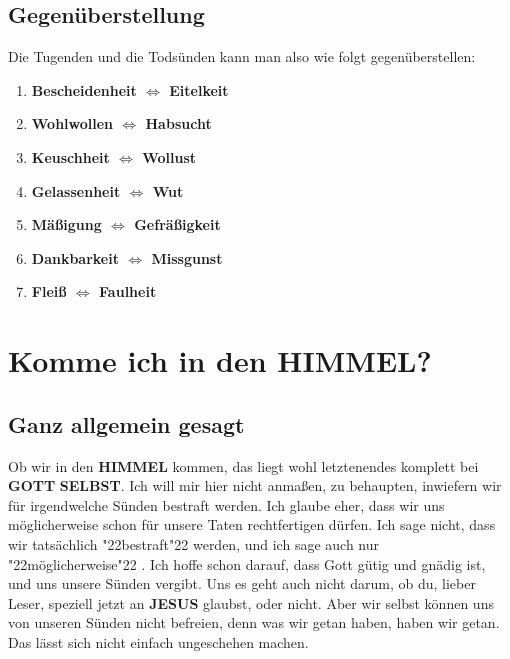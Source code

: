 \documentclass[10pt,a5paper]{article}
\newcommand{\Gott}[0]{\textbf{GOTT}}
\newcommand{\Himmel}[0]{\textbf{HIMMEL}}
\newcommand{\Jesus}[0]{\textbf{JESUS}}
\newcommand{\Selbst}[0]{\textbf{SELBST}}
\newcommand{\q}[1]{\char"22{#1}\char"22 }
\begin{document}
	\subsection{Gegen\"uberstellung}
		Die Tugenden und die Todsünden kann man also wie folgt gegen\"uberstellen:
		\begin{enumerate}
			\item \textbf{Bescheidenheit $\Longleftrightarrow$ Eitelkeit}
			\item \textbf{Wohlwollen $\Longleftrightarrow$ Habsucht}
			\item \textbf{Keuschheit $\Longleftrightarrow$ Wollust}
			\item \textbf{Gelassenheit $\Longleftrightarrow$ Wut}
			\item \textbf{M\"a{\ss}igung $\Longleftrightarrow$ Gefr\"a{\ss}igkeit}
			\item \textbf{Dankbarkeit $\Longleftrightarrow$ Missgunst}
			\item \textbf{Flei{\ss} $\Longleftrightarrow$ Faulheit}
		\end{enumerate}

	\newpage
	\section{Komme ich in den {\Himmel}?}
	
	\subsection{Ganz allgemein gesagt}
		Ob wir in den {\Himmel} kommen,
		das liegt wohl letztenendes komplett bei {\Gott} {\Selbst}.
		Ich will mir hier nicht anma{\ss}en,
		zu behaupten,
		inwiefern wir f\"ur irgendwelche S\"unden bestraft werden.
		Ich glaube eher,
		dass wir uns m\"oglicherweise schon f\"ur unsere Taten rechtfertigen d\"urfen.
		Ich sage nicht,
		dass wir tats\"achlich \q{bestraft} werden,
		und ich sage auch nur \q{m\"oglicherweise}.
		Ich hoffe schon darauf,
		dass Gott g\"utig und gn\"adig ist,
		und uns unsere S\"unden vergibt.
		Uns es geht auch nicht darum,
		ob du,
		lieber Leser,
		speziell jetzt an {\Jesus} glaubst,
		oder nicht.
		Aber wir selbst k\"onnen uns von unseren S\"unden nicht befreien,
		denn was wir getan haben,
		haben wir getan.
		Das l\"asst sich nicht einfach ungeschehen machen.
		
\end{document}
